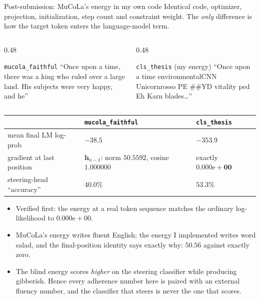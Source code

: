\documentclass{beamer}
\begin{document}
\begin{frame}[noframenumbering]{Post-submission: MuCoLa's energy in my own code}
  \scriptsize
  Identical code, optimizer, projection, initialization, step count and constraint weight. The
  \emph{only} difference is how the target token enters the language-model term.
  \vspace{0.3em}
  \begin{columns}[T]
    \begin{column}{0.48\textwidth}
      \begin{block}{\texttt{mucola\_faithful}}
        \scriptsize ``Once upon a time, there was a king who ruled over a large land. His
        subjects were very happy, and he''
      \end{block}
    \end{column}
    \begin{column}{0.48\textwidth}
      \begin{block}{\texttt{cls\_thesis} (my energy)}
        \scriptsize ``Once upon a time environmentalCNN Unicornrosso PE \#\#YD vitality ped Eh
        Karn blades\ldots''
      \end{block}
    \end{column}
  \end{columns}
  \vspace{0.2em}
  \begin{center}
  \setlength{\tabcolsep}{4pt}
  \begin{tabular}{lll}
    \toprule
    & \texttt{mucola\_faithful} & \texttt{cls\_thesis} \\
    \midrule
    mean final LM log-prob & $\bm{-38.5}$ & $\bm{-353.9}$ \\
    gradient at last position & $\bm{h}_{n-1}$: norm $50.5592$, cosine $1.000000$ & exactly $\bm{0.000\mathrm{e}{+}00}$ \\
    steering-head ``accuracy'' & $40.0\%$ & $53.3\%$ \\
    \bottomrule
  \end{tabular}
  \end{center}
  \vspace{0.2em}
  \begin{itemize}\scriptsize
    \item Verified first: the energy at a real token sequence matches the ordinary
      log-likelihood to $0.000\mathrm{e}{+}00$.
    \item MuCoLa's energy writes fluent English; the energy I implemented writes word salad, and
      the final-position identity says exactly why: $50.56$ against exactly zero.
    \item {} The blind energy scores \emph{higher} on the
      steering classifier while producing gibberish. Hence every adherence number here is paired
      with an external fluency number, and the classifier that steers is never the one that scores.
  \end{itemize}
\end{frame}
\end{document}
